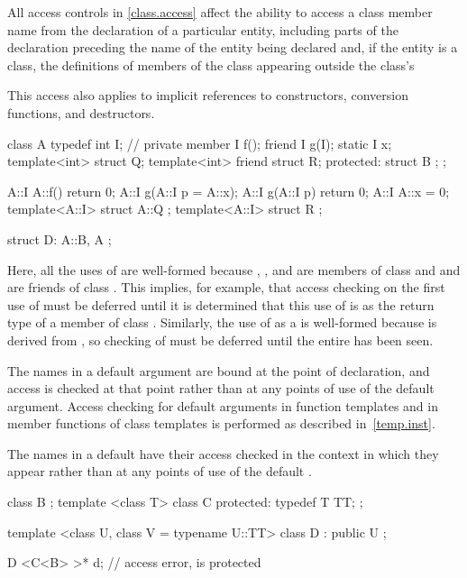 \pnum
All access controls in \ref{class.access} affect the ability to access a class member
name from the declaration of a particular
entity, including parts of the declaration preceding the name of the entity
being declared and, if the entity is a class, the definitions of members of
the class appearing outside the class's 
\begin{note} This access also applies to implicit references to constructors,
conversion functions, and destructors. \end{note}

\pnum
\begin{example}
\begin{codeblock}
class A {
  typedef int I;    // private member
  I f();
  friend I g(I);
  static I x;
  template<int> struct Q;
  template<int> friend struct R;
protected:
    struct B { };
};

A::I A::f() { return 0; }
A::I g(A::I p = A::x);
A::I g(A::I p) { return 0; }
A::I A::x = 0;
template<A::I> struct A::Q { };
template<A::I> struct R { };

struct D: A::B, A { };
\end{codeblock}

Here, all the uses of
are well-formed because
,
, and 
are members of class
and
and  are friends of class
.
This implies, for example, that access checking on the first use of
must be deferred until it is determined that this use of
is as the return type of a member of class
.
Similarly, the use of  as a
 is well-formed because 
is derived from , so checking of 
must be deferred until the entire  has been seen.
\end{example}

\pnum
{}%
%
The names in a default argument are
bound at the point of declaration, and access is checked at that
point rather than at any points of use of the default argument.
Access checking for default arguments in function templates and in
member functions of class templates is performed as described in~\ref{temp.inst}.

\pnum
The names in a default 
have their access checked in the context in which they appear rather than at any
points of use of the default . \begin{example}
\begin{codeblock}
class B { };
template <class T> class C {
protected:
  typedef T TT;
};

template <class U, class V = typename U::TT>
class D : public U { };

D <C<B> >* d;       // access error,  is protected
\end{codeblock}
\end{example}

